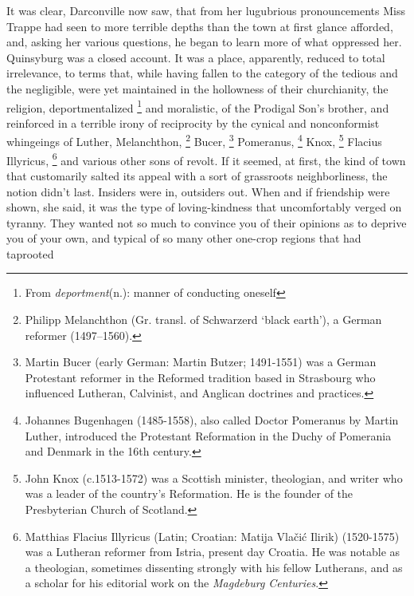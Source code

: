   It was clear, Darconville now saw, that from her lugubrious 
pronouncements Miss Trappe had seen to more terrible depths than the town at first glance
afforded, and, asking her various questions, he began to learn more of what
oppressed her. Quinsyburg was a closed account. It was a place, apparently,
reduced to total irrelevance, to terms that, while having fallen to the category
of the tedious and the negligible, were yet maintained in the hollowness of
their churchianity, the religion, deportmentalized 
\footnote{ \textdbend From \textit{deportment}(n.): manner of conducting 
  oneself}
and moralistic, of the Prodigal Son's brother, and reinforced in a terrible 
irony of reciprocity by the cynical and nonconformist whingeings 
of Luther, Melanchthon, 
\footnote{
Philipp Melanchthon (Gr. transl. of Schwarzerd ‘black earth’), a German reformer (1497–1560).
}
Bucer, 
\footnote{
Martin Bucer (early German: Martin Butzer; 1491-1551) was a German Protestant reformer in the Reformed tradition based in Strasbourg who influenced Lutheran, Calvinist, and Anglican doctrines and practices. 
}
Pomeranus, 
\footnote{
Johannes Bugenhagen (1485-1558), also called Doctor Pomeranus by Martin Luther, introduced the Protestant Reformation in the Duchy of Pomerania and Denmark in the 16th century. 
}
Knox, 
\footnote{
John Knox (c.1513-1572) was a Scottish minister, theologian, and writer who was a leader of the country's Reformation. He is the founder of the Presbyterian Church of Scotland.
}
Flacius Illyricus, 
\footnote{
Matthias Flacius Illyricus (Latin; Croatian: Matija Vlačić Ilirik) (1520-1575) 
was a Lutheran reformer from Istria, present day Croatia. He was notable as a 
theologian, sometimes dissenting strongly with his fellow Lutherans, and as a 
scholar for his editorial work on the \emph{Magdeburg Centuries}.
}
and various other sons of revolt. If it seemed, at
first, the kind of town that customarily salted its appeal with a sort of
grassroots neighborliness, the notion didn't last. Insiders were in, outsiders
out. When and if friendship were shown, she said, it was the type of
loving-kindness that uncomfortably verged 
on tyranny. They wanted not so much to
convince you of their opinions as to deprive you of your own, and typical of so
many other one-crop regions that had taprooted 
